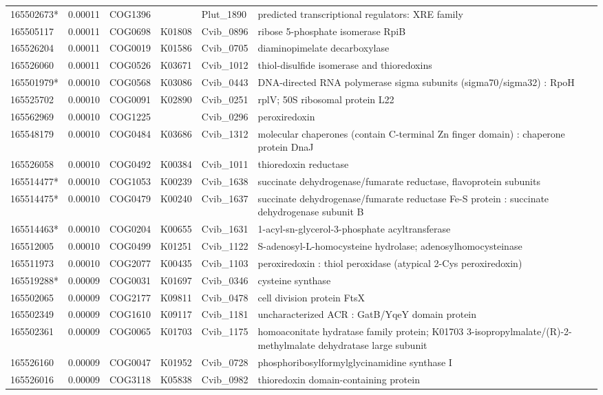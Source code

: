\begin{landscape}
\begin{longtable}{p{1.8cm}p{0.9cm}p{2.2cm}p{1cm}p{2.8cm}p{13.4cm}}
165502673*&0.00011&COG1396&&Plut\_1890&predicted transcriptional regulators: XRE family \\
165505117&0.00011&COG0698&K01808&Cvib\_0896&ribose 5-phosphate isomerase RpiB \\
165526204&0.00011&COG0019&K01586&Cvib\_0705&diaminopimelate decarboxylase \\
165526060&0.00011&COG0526&K03671&Cvib\_1012&thiol-disulfide isomerase and thioredoxins \\
165501979*&0.00010&COG0568&K03086&Cvib\_0443&DNA-directed RNA polymerase sigma subunits (sigma70/sigma32) : RpoH \\
165525702&0.00010&COG0091&K02890&Cvib\_0251&rplV; 50S ribosomal protein L22 \\
165562969&0.00010&COG1225&&Cvib\_0296&peroxiredoxin \\
165548179&0.00010&COG0484&K03686&Cvib\_1312&molecular chaperones (contain C-terminal Zn finger domain) : chaperone protein DnaJ \\
165526058&0.00010&COG0492&K00384&Cvib\_1011&thioredoxin reductase \\
165514477*&0.00010&COG1053&K00239&Cvib\_1638&succinate dehydrogenase/fumarate reductase, flavoprotein subunits \\
165514475*&0.00010&COG0479&K00240&Cvib\_1637&succinate dehydrogenase/fumarate reductase Fe-S protein : succinate dehydrogenase subunit B \\
165514463*&0.00010&COG0204&K00655&Cvib\_1631&1-acyl-sn-glycerol-3-phosphate acyltransferase \\
165512005&0.00010&COG0499&K01251&Cvib\_1122&S-adenosyl-L-homocysteine hydrolase; adenosylhomocysteinase \\
165511973&0.00010&COG2077&K00435&Cvib\_1103&peroxiredoxin : thiol peroxidase (atypical 2-Cys peroxiredoxin) \\
165519288*&0.00009&COG0031&K01697&Cvib\_0346&cysteine synthase \\
165502065&0.00009&COG2177&K09811&Cvib\_0478&cell division protein FtsX \\
165502349&0.00009&COG1610&K09117&Cvib\_1181&uncharacterized ACR : GatB/YqeY domain protein \\
165502361&0.00009&COG0065&K01703&Cvib\_1175&homoaconitate hydratase family protein; K01703 3-isopropylmalate/(R)-2-methylmalate dehydratase large subunit \\
165526160&0.00009&COG0047&K01952&Cvib\_0728&phosphoribosylformylglycinamidine synthase I \\
165526016&0.00009&COG3118&K05838&Cvib\_0982&thioredoxin domain-containing protein \\

\end{longtable}
\end{landscape}
